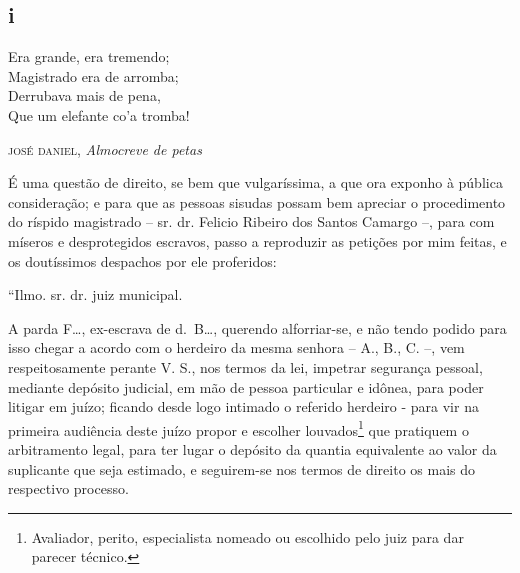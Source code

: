 {\begin{flushright}
\section{i}

\epigraph{Era grande, era tremendo;\\
Magistrado era de arromba;\\
Derrubava mais de pena,\\
Que um elefante co'a tromba!}{\textsc{josé daniel}\footnotemark, \emph{Almocreve de petas}\footnotemark}




É uma questão de direito, se bem que vulgaríssima, a que ora exponho à
pública consideração; e para que as pessoas sisudas possam bem apreciar
o procedimento do ríspido magistrado -- sr. dr. Felicio Ribeiro dos
Santos Camargo --, para com míseros e desprotegidos escravos, passo a
reproduzir as petições por mim feitas, e os doutíssimos despachos por
ele proferidos:

``Ilmo. sr. dr. juiz municipal.

A parda F\ldots{}, ex-escrava de d.~B\ldots{}, querendo alforriar-se, e não tendo
podido para isso chegar a acordo com o herdeiro da mesma senhora -- A.,
B., C. --, vem respeitosamente perante V. S., nos termos da lei,
impetrar segurança pessoal, mediante depósito judicial, em mão de pessoa
particular e idônea, para poder litigar em juízo; ficando desde logo
intimado o referido herdeiro - para vir na primeira audiência deste
juízo propor e escolher louvados\footnote{ Avaliador, perito,
  especialista nomeado ou escolhido pelo juiz para dar parecer técnico.}
que pratiquem o arbitramento legal, para ter lugar o depósito da quantia
equivalente ao valor da suplicante que seja estimado, e seguirem-se nos
termos de direito os mais do respectivo processo.


\end{flushright}}

